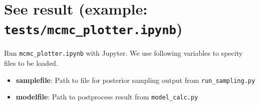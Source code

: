 \documentclass{report}
\begin{document}
\section{See result (example: \texttt{tests/mcmc\_plotter.ipynb})}
Run \texttt{mcmc\_plotter.ipynb} with Jupyter. We use following variables to specity files to be loaded. 
    \begin{itemize}
        \item \textbf{samplefile}: Path to file for posterior sampling output from \texttt{run\_sampling.py}
        \item \textbf{modelfile}: Path to postprocess result from \texttt{model\_calc.py}
    \end{itemize}


\end{document}

